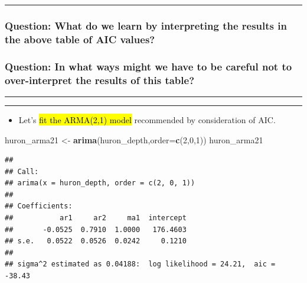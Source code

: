 \documentclass[]{article}
\newenvironment{Shaded}{\begin{snugshade}}{\end{snugshade}}
\newcommand{\KeywordTok}[1]{\textcolor[rgb]{0.13,0.29,0.53}{\textbf{#1}}}
\newcommand{\DataTypeTok}[1]{\textcolor[rgb]{0.13,0.29,0.53}{#1}}
\newcommand{\DecValTok}[1]{\textcolor[rgb]{0.00,0.00,0.81}{#1}}
\newcommand{\StringTok}[1]{\textcolor[rgb]{0.31,0.60,0.02}{#1}}
\newcommand{\NormalTok}[1]{#1}
\providecommand{\tightlist}{%
  \setlength{\itemsep}{0pt}\setlength{\parskip}{0pt}}
\begin{document}
\begin{center}\rule{0.5\linewidth}{\linethickness}\end{center}

\subsubsection{Question: What do we learn by interpreting the results in
the above table of AIC
values?}\label{question-what-do-we-learn-by-interpreting-the-results-in-the-above-table-of-aic-values}


\subsubsection{Question: In what ways might we have to be careful not to
over-interpret the results of this
table?}\label{question-in-what-ways-might-we-have-to-be-careful-not-to-over-interpret-the-results-of-this-table}


\begin{center}\rule{0.5\linewidth}{\linethickness}\end{center}

\begin{center}\rule{0.5\linewidth}{\linethickness}\end{center}

\begin{itemize}
\tightlist
\item
  Let's \hl{fit the ARMA(2,1) model} recommended by consideration of AIC.
\end{itemize}

\begin{Shaded}
\begin{Highlighting}[]
\NormalTok{huron_arma21 <-}\StringTok{ }\KeywordTok{arima}\NormalTok{(huron_depth,}\DataTypeTok{order=}\KeywordTok{c}\NormalTok{(}\DecValTok{2}\NormalTok{,}\DecValTok{0}\NormalTok{,}\DecValTok{1}\NormalTok{))}
\NormalTok{huron_arma21}
\end{Highlighting}
\end{Shaded}

\begin{verbatim}
## 
## Call:
## arima(x = huron_depth, order = c(2, 0, 1))
## 
## Coefficients:
##           ar1     ar2     ma1  intercept
##       -0.0525  0.7910  1.0000   176.4603
## s.e.   0.0522  0.0526  0.0242     0.1210
## 
## sigma^2 estimated as 0.04188:  log likelihood = 24.21,  aic = -38.43
\end{verbatim}
\end{document}
